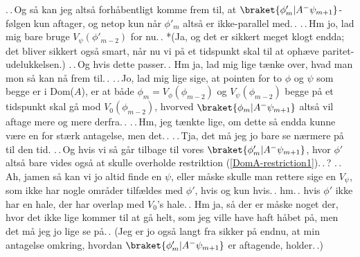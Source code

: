 \documentclass{report}
\begin{document}
.\,.\,Og så kan jeg altså forhåbentligt komme frem til, at $\braket{\phi'_{m} | A^- \psi_{m+1}}$-følgen kun aftager, og netop kun når $\phi'_m$ altså er ikke-parallel med.\,. .\,.\,Hm jo, lad mig bare bruge $V_\psi(\phi'_{m-2})$ for nu.\,. *(Ja, og det er sikkert meget klogt endda; det bliver sikkert også smart, når nu vi på et tidspunkt skal til at ophæve paritet-udelukkelsen.) .\,.\,Og hvis dette passer.\,. Hm ja, lad mig lige tænke over, hvad man mon så kan nå frem til.\,. .\,.\,Jo, lad mig lige sige, at pointen for to $\phi$ og $\psi$ som begge er i Dom($A$), er at både $\phi_m = V_\phi(\phi_{m-2})$ og $V_\psi(\phi_{m-2})$ begge på et tidspunkt skal gå mod $V_0(\phi_{m-2})$, hvorved $\braket{\phi_{m} | A^- \psi_{m+1}}$ altså vil aftage mere og mere derfra.\,. .\,.\,Hm, jeg tænkte lige, om dette så endda kunne være en for stærk antagelse, men det.\,. .\,.\,Tja, det må jeg jo bare se nærmere på til den tid. .\,.\,Og hvis vi så går tilbage til vores $\braket{\phi'_{m} | A^- \psi_{m+1}}$, hvor $\phi'$ altså bare vides også at skulle overholde restriktion (\ref{DomA-restriction1}).\,.\,? .\,.\,Ah, jamen så kan vi jo altid finde en $\psi$, eller måske skulle man rettere sige en $V_\psi$, som ikke har nogle områder tilfældes med $\phi'$, hvis og kun hvis.\,. hm.\,. hvis $\phi'$ ikke har en hale, der har overlap med $V_0$'s hale.\,. Hm ja, så der er måske noget der, hvor det ikke lige kommer til at gå helt, som jeg ville have haft håbet på, men det må jeg jo lige se på.\,. (Jeg er jo også langt fra sikker på endnu, at min antagelse omkring, hvordan $\braket{\phi'_{m} | A^- \psi_{m+1}}$ er aftagende, holder.\,.) 
\end{document}
